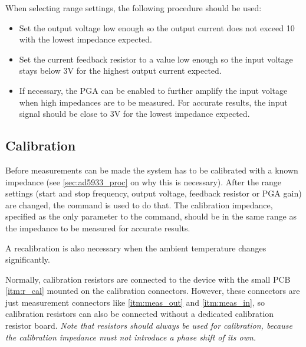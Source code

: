 When selecting range settings, the following procedure should be used:
\begin{itemize}
	\item Set the output voltage low enough so the output current does not exceed \unit{10}{\milli\ampere} with the
    lowest impedance expected.
  \item Set the current feedback resistor to a value low enough so the input voltage stays below 3V for the highest
    output current expected.
  \item If necessary, the PGA can be enabled to further amplify the input voltage when high impedances are to be
    measured. For accurate results, the input signal should be close to 3V for the lowest impedance expected.
\end{itemize}

\subsection{Calibration}

Before measurements can be made the system has to be calibrated with a known impedance (see \autoref{sec:ad5933_proc}
on why this is necessary). After the range settings (start and stop frequency, output voltage, feedback resistor or
PGA gain) are changed, the  command is used to do that. The calibration impedance, specified
as the only parameter to the  command, should be in the same range as the impedance to be
measured for accurate results.

A recalibration is also necessary when the ambient temperature changes significantly.

Normally, calibration resistors are connected to the device with the small PCB \ref{itm:r_cal} mounted on the
calibration connectors. However, these connectors are just measurement connectors like \ref{itm:meas_out} and
\ref{itm:meas_in}, so calibration resistors can also be connected without a dedicated calibration resistor board.
\emph{Note that resistors should always be used for calibration, because the calibration impedance must not introduce
  a phase shift of its own.}
